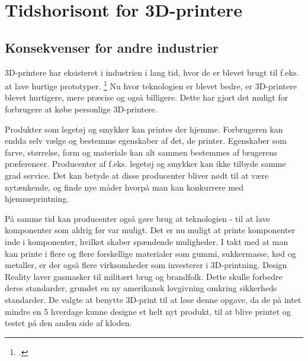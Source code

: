 
\section{Tidshorisont for 3D-printere}
\subsection{Konsekvenser for andre industrier}


3D-printere har eksisteret i industrien i lang tid, hvor de er blevet brugt til f.eks. at lave hurtige prototyper. \footcite[105]{manyika_disruptive_2013} Nu hvor teknologien er blevet bedre, er 3D-printere blevet hurtigere, mere præcise og også billigere. Dette har gjort det muligt for forbrugere at købe personlige 3D-printere. 


Produkter som legetøj og smykker kan printes der hjemme. Forbrugeren kan endda selv vælge og bestemme egenskaber af det, de printer. Egenskaber som farve, størrelse, form og materiale kan alt sammen bestemmes af brugerens præferencer. Producenter af f.eks. legetøj og smykker kan ikke tilbyde samme grad service. Det kan betyde at disse producenter bliver nødt til at være nytænkende, og finde nye måder hvorpå man kan konkurrere med hjemmeprintning.

På samme tid kan producenter også gøre brug at teknologien -{} til at lave komponenter som aldrig før var muligt. Det er nu muligt at printe komponenter inde i komponenter, hvilket skaber spændende muligheder.
I takt med at man kan printe i flere og flere forskellige materialer som gummi, sukkermasse, kød og metaller, er der også flere virksomheder som investerer i 3D-printning.
Design Reality laver gasmasker til militært brug og brandfolk. Dette skulle forbedre deres standarder, grundet en ny amerikansk lovgivning omkring sikkerheds standarder. De valgte at benytte 3D-print til at løse denne opgave, da de på intet mindre en 5 hverdage kunne designe et helt nyt produkt, til at blive printet og testet på den anden side af kloden. \autocite{3ders.org_design_2013}



